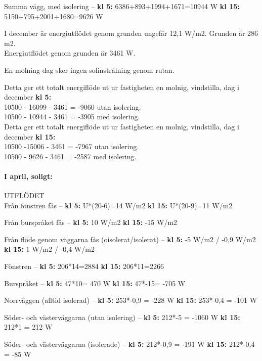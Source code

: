 Summa vägg, med isolering –
\textbf{kl 5:} 6386+893+1994+1671=10944 W
\textbf{kl 15:} 5150+795+2001+1680=9626 W

I december är energiutflödet genom grunden ungefär 12,1 W/m2. Grunden är 286 m2.\\
Energiutflödet genom grunden är 3461 W.

En molning dag sker ingen solinstrålning genom rutan.

Detta ger ett totalt energiflöde ut ur fastigheten en molnig, vindstilla, dag i december \textbf{kl 5:}\\
10500 - 16099 - 3461 = -9060 utan isolering.\\
10500 - 10944 - 3461 = -3905 med isolering.\\

Detta ger ett totalt energiflöde ut ur fastigheten en molnig, vindstilla, dag i december \textbf{kl 15:}\\
10500 -15006 - 3461 = -7967 utan isolering.\\
10500 - 9626 - 3461 = -2587 med isolering.\\


\paragraph{I april, soligt:}
UTFLÖDET\\

Från fönstren fås –
\textbf{kl 5:} U*(20-6)=14 W/m2
\textbf{kl 15:} U*(20-9)=11 W/m2

Från burspråket fås –
\textbf{kl 5:} 10 W/m2
\textbf{kl 15:} -15 W/m2

Från flöde genom väggarna fås (oisolerat/isolerat) –
\textbf{kl 5:} -5 W/m2 / -0,9 W/m2
\textbf{kl 15:} 1 W/m2 / -0,4 W/m2


Fönstren –
\textbf{kl 5:} 206*14=2884
\textbf{kl 15:} 206*11=2266

Burspråket – 
\textbf{kl 5:} 47*10= 470 W
\textbf{kl 15:} 47*-15= -705 W

Norrväggen (alltid isolerad) –
\textbf{kl 5:} 253*-0,9 = -228 W
\textbf{kl 15:} 253*-0,4 = -101 W

Söder- och västerväggarna (utan isolering) –
\textbf{kl 5:} 212*-5 = -1060 W
\textbf{kl 15:} 212*1 = 212 W

Söder- och västerväggarna (isolerade) –
\textbf{kl 5:} 212*-0,9 = -191 W
\textbf{kl 15:} 212*-0,4 = -85 W

